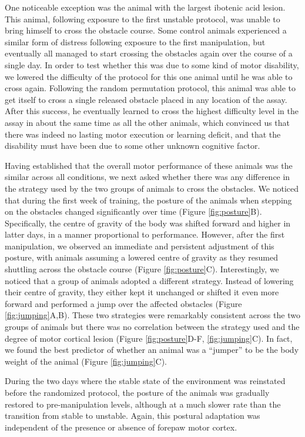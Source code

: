One noticeable exception was the animal with the largest ibotenic acid lesion. This animal, following exposure to the first unstable protocol, was unable to bring himself to cross the obstacle course. Some control animals experienced a similar form of distress following exposure to the first manipulation, but eventually all managed to start crossing the obstacles again over the course of a single day. In order to test whether this was due to some kind of motor disability, we lowered the difficulty of the protocol for this one animal until he was able to cross again. Following the random permutation protocol, this animal was able to get itself to cross a single released obstacle placed in any location of the assay. After this success, he eventually learned to cross the highest difficulty level in the assay in about the same time as all the other animals, which convinced us that there was indeed no lasting motor execution or learning deficit, and that the disability must have been due to some other unknown cognitive factor. 

Having established that the overall motor performance of these animals was the similar across all conditions, we next asked whether there was any difference in the strategy used by the two groups of animals to cross the obstacles. We noticed that during the first week of training, the posture of the animals when stepping on the obstacles changed significantly over time (Figure \ref{fig:posture}B). Specifically, the centre of gravity of the body was shifted forward and higher in latter days, in a manner proportional to performance. However, after the first manipulation, we observed an immediate and persistent adjustment of this posture, with animals assuming a lowered centre of gravity as they resumed shuttling across the obstacle course (Figure \ref{fig:posture}C). Interestingly, we noticed that a group of animals adopted a different strategy. Instead of lowering their centre of gravity, they either kept it unchanged or shifted it even more forward and performed a jump over the affected obstacles (Figure \ref{fig:jumping}A,B). These two strategies were remarkably consistent across the two groups of animals but there was no correlation between the strategy used and the degree of motor cortical lesion (Figure \ref{fig:posture}D-F, \ref{fig:jumping}C). In fact, we found the best predictor of whether an animal was a ``jumper'' to be the body weight of the animal (Figure \ref{fig:jumping}C).

During the two days where the stable state of the environment was reinstated before the randomized protocol, the posture of the animals was gradually restored to pre-manipulation levels, although at a much slower rate than the transition from stable to unstable. Again, this postural adaptation was independent of the presence or absence of forepaw motor cortex.

